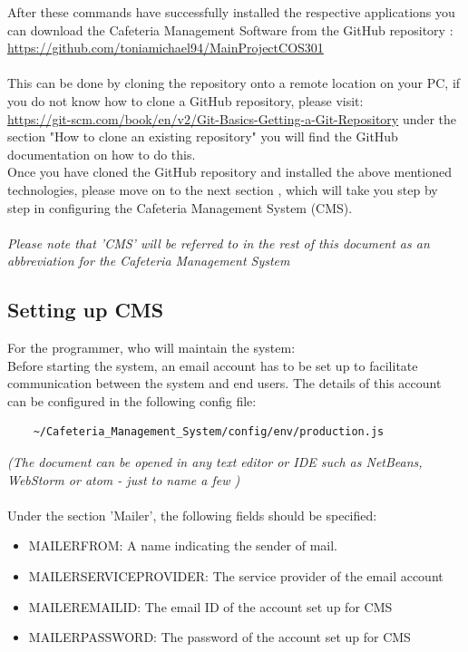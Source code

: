 \documentclass[a4paper,12pt]{report}
\begin{document}
After these commands have successfully installed the respective applications you can download the Cafeteria Management Software from the GitHub repository :
 \url{https://github.com/toniamichael94/MainProjectCOS301}
\\ \\
This can be done by cloning the repository onto a remote location on your PC, if you do not know how to clone a GitHub repository, please visit:\\
  \url{https://git-scm.com/book/en/v2/Git-Basics-Getting-a-Git-Repository}  under the section "How to clone an existing repository" you will find the GitHub documentation on how to do this.
\\
Once you have cloned the GitHub repository and installed the above mentioned technologies, please move on to the next section , which will take you step by step in configuring the Cafeteria Management System (CMS).
\\ \\
{\em Please note that 'CMS' will be referred to in the rest of this document as an abbreviation for the Cafeteria Management System}


\subsection{Setting up CMS}
For the programmer, who will maintain the system: \\
Before starting the system, an email account has to be set up to facilitate communication between the system and end users. The details of this account can be configured in the following config file:
\begin{verbatim}
	~/Cafeteria_Management_System/config/env/production.js
\end{verbatim} 
{\em (The document can be opened in any text editor or IDE  such as NetBeans, WebStorm or atom - just to name a few )}
\\ \\
Under the section 'Mailer', the following fields should be specified:\\
\begin{itemize}
\item MAILER\textunderscore FROM: A name indicating the sender of mail.
\item MAILER\textunderscore SERVICE\textunderscore PROVIDER: The service provider of the email account
\item MAILER\textunderscore EMAIL\textunderscore ID: The email ID of the account set up for CMS
\item MAILER\textunderscore PASSWORD: The password of the account set up for CMS
\end{itemize}
\end{document}

